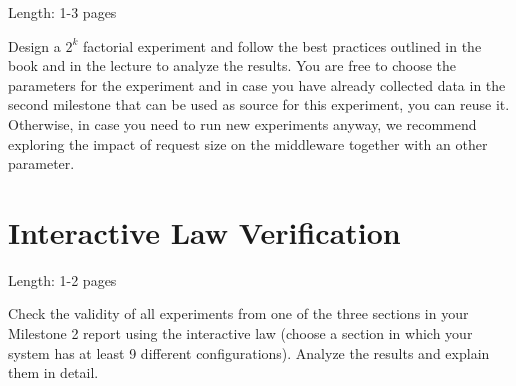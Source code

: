 \documentclass[11pt]{article}
\begin{document}
Length: 1-3 pages

Design a $2^k$ factorial experiment and follow the best practices outlined in the book and in the lecture to analyze the results. You are free to choose the parameters for the experiment and in case you have already collected data in the second milestone that can be used as source for this experiment, you can reuse it. Otherwise, in case you need to run new experiments anyway, we recommend exploring the impact of request size on the middleware together with an other parameter.

\section{Interactive Law Verification}\label{sec:interactive-law}

Length: 1-2 pages

Check the validity of all experiments from one of the three sections in your Milestone 2 report using the interactive law (choose a section in which your system has at least 9 different configurations). Analyze the results and explain them in detail.
\end{document}
